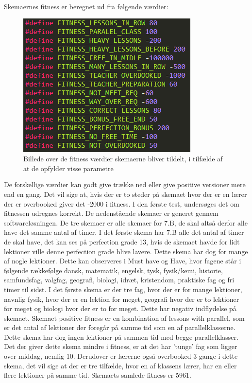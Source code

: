 Skemaernes fitness er beregnet ud fra følgende værdier:
\begin{figure}[!h]
\includegraphics[width=\textwidth]{partials/graphics/fitness.png}
\caption{Billede over de fitness værdier skemaerne bliver tildelt, i tilfælde af at de opfylder visse parametre}
\label{fitnessvalues}
\end{figure}
De forskellige værdier kan godt give trække ned eller give positive versioner mere end en gang. Det vil sige at, hvis der er to steder på skemaet hvor der er en lærer der er overbooked giver det -2000 i fitness.
I den første test, undersøges det om fitnessen udregnes korrekt. De nedenstående skemaer er generet gennem softwareløsningen. De tre skemaer er alle skemaer for 7.B, de skal altså derfor alle have det samme antal af timer. 
I det første skema har 7.B alle det antal af timer de skal have, det kan ses på perfection grade 13, hvis de skemaet havde for lidt lektioner ville denne perfection grade blive lavere. Dette skema har dog for mange af nogle lektioner. Dette kan observeres i Must have og Have, hvor fagene står i følgende rækkefølge dansk, matematik, engelsk, tysk, fysik/kemi, historie, samfundsfag, valgfag, geografi, biologi, idræt, kristendom, praktiske fag og fri timer til sidst. I det første skema er der tre fag, hvor der er for mange lektioner, navnlig fysik, hvor der er en lektion for meget, geografi hvor der er to lektioner for meget og biologi hvor der er to for meget. Dette har negativ indflydelse på skemaet.
Skemaet positive fitness er en kombination af lessons with parallel, som er det antal af lektioner der foregår på samme tid som en af parallelklasserne. Dette skema har dog ingen lektioner på sammen tid med begge parallelklasser. Det der giver dette skema mindre i fitness, er at det har ’tunge’ fag som ligger over middag, nemlig 10. Derudover er lærerne også overbooked 3 gange i dette skema, det vil sige at der er tre tilfælde, hvor en af klassens lærer, har en eller flere lektioner på samme tid. Skemaets samlede fitness er 5961. 
